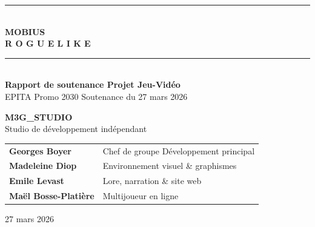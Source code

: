\documentclass[12pt,a4paper]{article}
\begin{document}
\begin{titlepage}
  \centering
  \vspace*{1.5cm}


  {\color{rulegray}\rule{12cm}{0.5pt}}\\[0.5cm]

  {\LARGE\bfseries\color{titlegray} MOBIUS}\\[0.3cm]
  {\large\bfseries\color{sectionblue} R O G U E L I K E}\\[0.4cm]

  {\color{rulegray}\rule{12cm}{0.5pt}}\\[1.2cm]

  {\large\bfseries Rapport de soutenance \textemdash{} Projet Jeu-Vidéo}\\[0.4cm]
  {\normalsize\color{gray}EPITA \textemdash{} Promo 2030 \textemdash{} Soutenance du 27 mars 2026}\\[2cm]

  \begin{mdframed}[
    linecolor=sectionblue,
    linewidth=1.5pt,
    innerleftmargin=20pt,
    innerrightmargin=20pt,
    innertopmargin=14pt,
    innerbottommargin=14pt,
    roundcorner=4pt,
  ]
  \centering
  {\Large\bfseries M3G\_STUDIO}\\[4pt]
  {\small\color{gray} Studio de développement indépendant}
  \end{mdframed}

  \vspace{2cm}

  \begin{tabular}{@{}ll@{}}
    \textbf{Georges Boyer}         & Chef de groupe \textemdash{} Développement principal \\[6pt]
    \textbf{Madeleine Diop}        & Environnement visuel \& graphismes \\[6pt]
    \textbf{Emile Levast}          & Lore, narration \& site web \\[6pt]
    \textbf{Maël Bosse-Platière}   & Multijoueur en ligne \\
  \end{tabular}

  \vfill
  {\small\color{gray} 27 mars 2026}
\end{titlepage}
\end{document}
